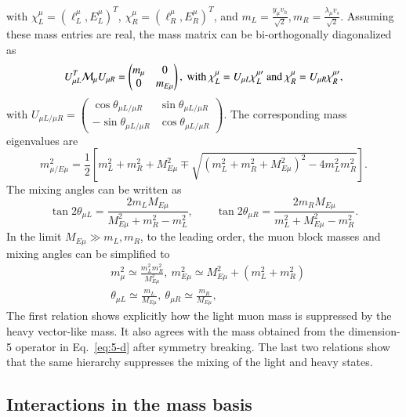 \documentclass[onecolumn, aps, nofootinbib, prd, preprint, floats, floatfix, amsmath, amssymb, superscriptaddress, preprintnumbers]{revtex4-2}
\begin{document}
with $\chi^\mu_L=(\ell^\mu_L, E^\mu_L)^T$, $\chi^\mu_R =
(\ell^\mu_R,E^\mu_R)^T$, and $m_L=\frac{y_\mu v_h}{\sqrt2},
m_R=\frac{\lambda_\mu v_s}{\sqrt2}$. Assuming these mass entries are real, the mass matrix can be bi-orthogonally diagonalized as
\begin{equation}
U_{\mu L}^T\mathcal{M}_\mu U_{\mu R} =
\begin{pmatrix}
m_\mu &0\\
0&m_{E\mu}
\end{pmatrix},~ {\rm with}~
\chi^\mu_L=U_{\mu L} \chi^{\mu \prime}_L~{\rm and}~
\chi^\mu_R=U_{\mu R} \chi^{\mu \prime}_R,
\end{equation}
with $U_{\mu L/\mu R}=\begin{pmatrix}\cos\theta_{\mu L/\mu R} &\sin\theta_{\mu L/\mu R}\\-\sin\theta_{\mu L/\mu R} & \cos\theta_{\mu L/\mu R} \end{pmatrix}$. The corresponding mass eigenvalues are
\begin{equation}
m_{\mu/E\mu}^2=
\frac{1}{2}
\left[
m_L^2+m_R^2+M_{E\mu}^2 \mp
\sqrt{(m_L^2+m_R^2+M_{E\mu}^2)^2-4m_L^2m_R^2}
\right].
\label{eq:exact-masses-2by2}
\end{equation}
The mixing angles can be written as
\begin{equation}
\tan2\theta_{\mu L}= \frac{2m_L M_{E\mu}}{M_{E\mu}^2+m_R^2-m_L^2},
\qquad
\tan2\theta_{\mu R}=\frac{2m_R M_{E\mu}}{m_L^2+M_{E\mu}^2-m_R^2}.
\label{eq:mixing-angles-2by2}
\end{equation}
In the limit $M_{E\mu}\gg m_L, m_R$, to the leading order, the muon block masses and mixing angles can be simplified to
\begin{equation}
\begin{aligned}
    &m_\mu^2\simeq\frac{m_L^2 m_R^2}{M_{E\mu}^2},~ m_{E\mu}^2\simeq M_{E\mu}^2+(m_L^2 + m_R^2)\\
    &\theta_{\mu L}\simeq \frac{m_L}{M_{E\mu}},~ \theta_{\mu R}\simeq \frac{m_R}{M_{E\mu}},
\end{aligned}
\end{equation}
The first relation shows explicitly how the light muon mass is suppressed by
the heavy vector-like mass.  It also agrees with the mass obtained from the
dimension-5 operator in Eq.~\eqref{eq:5-d} after symmetry breaking.  The last
two relations show that the same hierarchy suppresses the mixing of the light
and heavy states.

\subsection{Interactions in the mass basis}
\end{document}
